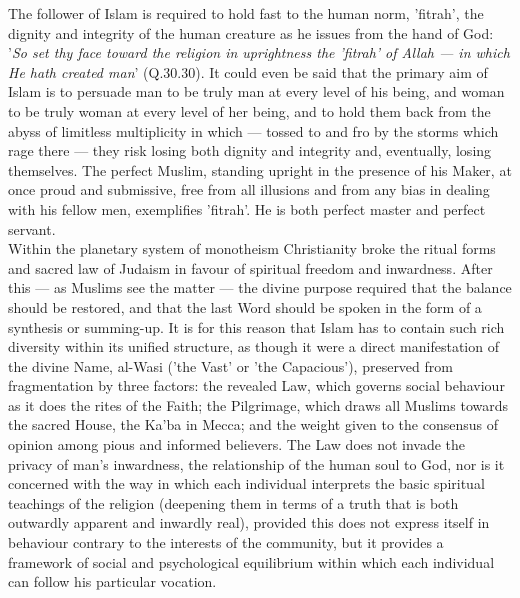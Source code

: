 \documentclass[10pt, twoside,openright]{book}
\begin{document}
The follower of Islam is required to hold fast to the human norm, 'fitrah', the dignity and integrity 
of the human creature as he issues from the hand of God: '\emph{So set thy face toward the religion in 
uprightness the 'fitrah' of Allah --- in which He hath created man}' (Q.30.30). It could even be said 
that the primary aim of Islam is to persuade man to be truly man at every level of his being, and 
woman to be truly woman at every level of her being, and to hold them back from the abyss of 
limitless multiplicity in which --- tossed to and fro by the storms which rage there --- they risk losing 
both dignity and integrity and, eventually, losing themselves. The perfect Muslim, standing upright 
in the presence of his Maker, at once proud and submissive, free from all illusions and from any bias 
in dealing with his fellow men, exemplifies 'fitrah'. He is both perfect master and perfect servant. \\

Within the planetary system of monotheism Christianity broke the ritual forms and sacred law of 
Judaism in favour of spiritual freedom and inwardness. After this --- as Muslims see the matter --- the 
divine purpose required that the balance should be restored, and that the last Word should be spoken 
in the form of a synthesis or summing\hyp{}up. It is for this reason that Islam has to contain such rich 
diversity within its unified structure, as though it were a direct manifestation of the divine Name, 
al\hyp{}Wasi ('the Vast' or 'the Capacious'), preserved from fragmentation by three factors: the revealed 
Law, which governs social behaviour as it does the rites of the Faith; the Pilgrimage, which draws 
all Muslims towards the sacred House, the Ka'ba in Mecca; and the weight given to the consensus of 
opinion among pious and informed believers. The Law does not invade the privacy of man's inwardness, 
the relationship of the human soul to God, nor is it concerned with the way in which each individual 
interprets the basic spiritual teachings of the religion (deepening them in terms of a truth that is 
both outwardly apparent and inwardly real), provided this does not express itself in behaviour 
contrary to the interests of the community, but it provides a framework of social and psychological 
equilibrium within which each individual can follow his particular vocation. \\
\end{document}
